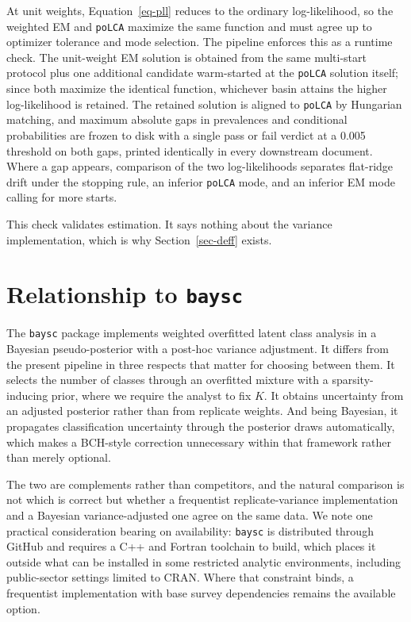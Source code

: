\documentclass[
  12pt]{article}
\begin{document}
At unit weights, Equation~\ref{eq-pll} reduces to the ordinary
log-likelihood, so the weighted EM and \texttt{poLCA} \citep{linzer2011}
maximize the same function and must agree up to optimizer tolerance and
mode selection. The pipeline enforces this as a runtime check. The
unit-weight EM solution is obtained from the same multi-start protocol
plus one additional candidate warm-started at the \texttt{poLCA}
solution itself; since both maximize the identical function, whichever
basin attains the higher log-likelihood is retained. The retained
solution is aligned to \texttt{poLCA} by Hungarian matching, and maximum
absolute gaps in prevalences and conditional probabilities are frozen to
disk with a single pass or fail verdict at a 0.005 threshold on both
gaps, printed identically in every downstream document. Where a gap
appears, comparison of the two log-likelihoods separates flat-ridge
drift under the stopping rule, an inferior \texttt{poLCA} mode, and an
inferior EM mode calling for more starts.

This check validates estimation. It says nothing about the variance
implementation, which is why Section~\ref{sec-deff} exists.

\section{\texorpdfstring{Relationship to
\texttt{baysc}}{Relationship to baysc}}\label{sec-baysc}

The \texttt{baysc} package \citep{wu2024, wu2026joss} implements
weighted overfitted latent class analysis in a Bayesian pseudo-posterior
\citep{savitsky2016} with a post-hoc variance adjustment. It differs
from the present pipeline in three respects that matter for choosing
between them. It selects the number of classes through an overfitted
mixture with a sparsity-inducing prior, where we require the analyst to
fix \(K\). It obtains uncertainty from an adjusted posterior rather than
from replicate weights. And being Bayesian, it propagates classification
uncertainty through the posterior draws automatically, which makes a
BCH-style correction unnecessary within that framework rather than
merely optional.

The two are complements rather than competitors, and the natural
comparison is not which is correct but whether a frequentist
replicate-variance implementation and a Bayesian variance-adjusted one
agree on the same data. We note one practical consideration bearing on
availability: \texttt{baysc} is distributed through GitHub and requires
a C++ and Fortran toolchain to build, which places it outside what can
be installed in some restricted analytic environments, including
public-sector settings limited to CRAN. Where that constraint binds, a
frequentist implementation with base survey dependencies remains the
available option.
\end{document}
